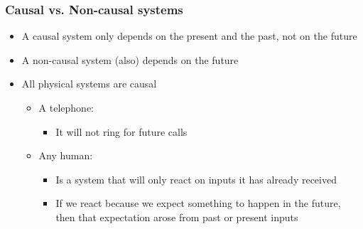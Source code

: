 \begin{frame}
	\frametitle{Causal vs. Non-causal systems}
	\begin{itemize}
		\item \normalsize{A causal system only depends on the present and the past, not on the future}
		\item \normalsize{A non-causal system (also) depends on the future}
		\item \normalsize{All physical systems are causal}
		\begin{itemize}
			\item \normalsize{A telephone:}
			\begin{itemize}
				\item \normalsize{It will not ring for future calls}
			\end{itemize}
			\item \normalsize{Any human:} 
			\begin{itemize}
				\item \normalsize{Is a system that will only react on inputs it has already received}
				\item \normalsize{If we react because we expect something to happen in the future, then that expectation arose from past or present inputs}
			\end{itemize}
		\end{itemize}
	\end{itemize}
	\bigskip
\end{frame}



